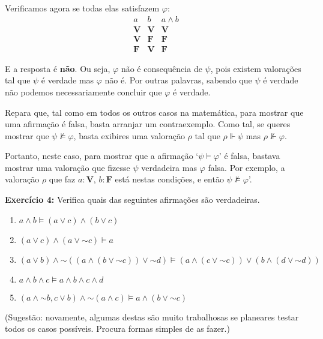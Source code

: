 \documentclass{article}
\theoremstyle{definition}
\theoremstyle{remark}
\newcommand{\V}{\mathbf{V}}
\newcommand{\F}{\mathbf{F}}
\newcommand*{\lneg}{\mathord{\sim}}
\begin{document}
	Verificamos agora se todas elas satisfazem $\varphi$:
	\[
	\begin{array}{c|c|c}
	a&b&a\land b\\
	\hline
	\V&\V&\V\\
	\V&\F&\F\\
	\F&\V&\F
	\end{array}
	\]
	
	E a resposta é \textbf{não}. Ou seja, $\varphi$ não é consequência de $\psi$, pois existem valorações tal que $\psi$ é verdade mas $\varphi$ não é. Por outras palavras, sabendo que $\psi$ é verdade não podemos necessariamente concluir que $\varphi$ é verdade.
	
	Repara que, tal como em todos os outros casos na matemática, para mostrar que uma afirmação é falsa, basta arranjar um contraexemplo. Como tal, se queres mostrar que $\psi \nvDash \varphi$, basta exibires uma valoração $\rho$ tal que $\rho \Vdash \psi$ mas $\rho \nVdash \varphi$.
	
	Portanto, neste caso, para mostrar que a afirmação `$\psi \vDash \varphi$' é falsa, bastava mostrar uma valoração que fizesse $\psi$ verdadeira mas $\varphi$ falsa. Por exemplo, a valoração $\rho$ que faz $a : \V$, $b : \F$ está nestas condições, e então $\psi \nvDash \varphi$'.
	
	\bigskip
		
	\textbf{Exercício 4:} Verifica quais das seguintes afirmações são verdadeiras.
	
	\begin{enumerate}
	\item $a \land b \vDash (a \lor c) \land (b \lor c)$
	
	\item $(a \lor c) \land (a \lor \lneg c) \vDash a$
	
	\item $(a \lor b) \land \lneg( (a \land (b \lor \lneg c)) \lor \lneg d) \vDash (a \land (c \lor \lneg c)) \lor (b \land (d \lor \lneg d))$
	
	\item $a \land b \land c \vDash a \land b \land c \land d$
	
	\item $(a \land \lneg b, c \lor b) \land \lneg(a \land c) \vDash a \land (b \lor \lneg c)$
	\end{enumerate}
	
	(Sugestão: novamente, algumas destas são muito trabalhosas se planeares testar todos os casos possíveis. Procura formas simples de as fazer.)
	
\end{document}
